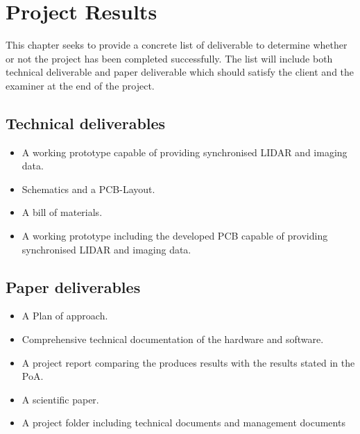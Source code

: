 \chapter{Project Results}
\label{ch:results}
This chapter seeks to provide a concrete list of deliverable to determine whether or not the project has been completed successfully. The list will include both technical deliverable and paper deliverable which should satisfy the client and the examiner at the end of the project.

\section{Technical deliverables}
\begin{itemize}
    \item A working prototype capable of providing synchronised LIDAR and imaging data.
    \item Schematics and a PCB-Layout.
    \item A bill of materials.
    \item A working prototype including the developed PCB capable of providing synchronised LIDAR and imaging data.
\end{itemize}

\section{Paper deliverables}
\begin{itemize}
    \item A Plan of approach.
    \item Comprehensive technical documentation of the hardware and
    software.
    \item A project report comparing the produces results with the results stated in the PoA.
    \item A scientific paper.
    \item A project folder including technical documents and management documents
\end{itemize}